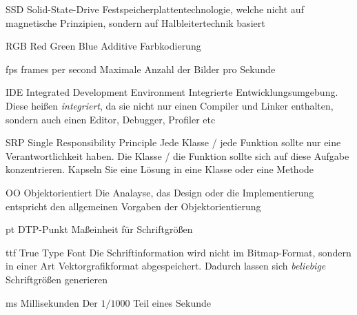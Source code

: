   {SSD}            %
  {Solid-State-Drive}  %
  {Festspeicherplattentechnologie, welche nicht auf magnetische Prinzipien, sondern auf Halbleitertechnik basiert} %

  {RGB}            %
  {Red Green Blue}  %
  {Additive Farbkodierung} %

  {fps}            %
  {frames per second}  %
  {Maximale Anzahl der Bilder pro Sekunde} %

  {IDE}            %
  {Integrated Development Environment}  %
  {Integrierte Entwicklungsumgebung. Diese heißen \emph{integriert}, da sie nicht nur einen Compiler und Linker enthalten, sondern auch einen Editor, Debugger, Profiler etc} %

  {SRP}            %
  {Single Responsibility Principle}  %
  {Jede Klasse / jede Funktion sollte nur eine Verantwortlichkeit haben. Die Klasse / die Funktion sollte sich
  auf diese Aufgabe konzentrieren. Kapseln Sie eine Lösung in eine Klasse oder eine Methode} %

  {OO}            %
  {Objektorientiert}  %
  {Die Analayse, das Design oder die Implementierung entspricht den allgemeinen Vorgaben der Objektorientierung} %

  {pt}            %
  {DTP-Punkt}  %
  {Maßeinheit für Schriftgrößen} %

  {ttf}            %
  {True Type Font}  %
  {Die Schriftinformation wird nicht im Bitmap-Format, sondern in einer Art Vektorgrafikformat abgespeichert. Dadurch lassen sich \emph{beliebige} Schriftgrößen generieren} %

  {ms}            %
  {Millisekunden}  %
  {Der $1/1000$ Teil eines Sekunde} %

